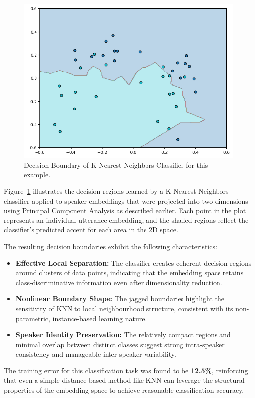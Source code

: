 \documentclass[conference]{IEEEtran}
\begin{document}
\begin{figure}[H]
	\centering
	\includegraphics[width=0.7\linewidth]{img/img-knn-shl-ilo.png}
	\caption{Decision Boundary of K-Nearest Neighbors Classifier for this example.}
	\label{fig:knn-shl-ilo}
\end{figure}

Figure~\ref{fig:knn-shl-ilo} illustrates the decision regions learned by a K-Nearest Neighbors classifier applied to speaker embeddings that were projected into two dimensions using Principal Component Analysis as described earlier. Each point in the plot represents an individual utterance embedding, and the shaded regions reflect the classifier’s predicted accent for each area in the 2D space.

The resulting decision boundaries exhibit the following characteristics:

\begin{itemize}
	\item \textbf{Effective Local Separation:} The classifier creates coherent decision regions around clusters of data points, indicating that the embedding space retains class-discriminative information even after dimensionality reduction.
	\item \textbf{Nonlinear Boundary Shape:} The jagged boundaries highlight the sensitivity of KNN to local neighbourhood structure, consistent with its non-parametric, instance-based learning nature.
	\item \textbf{Speaker Identity Preservation:} The relatively compact regions and minimal overlap between distinct classes suggest strong intra-speaker consistency and manageable inter-speaker variability.
\end{itemize}

The training error for this classification task was found to be \textbf{12.5\%}, reinforcing that even a simple distance-based method like KNN can leverage the structural properties of the embedding space to achieve reasonable classification accuracy.
\end{document}
